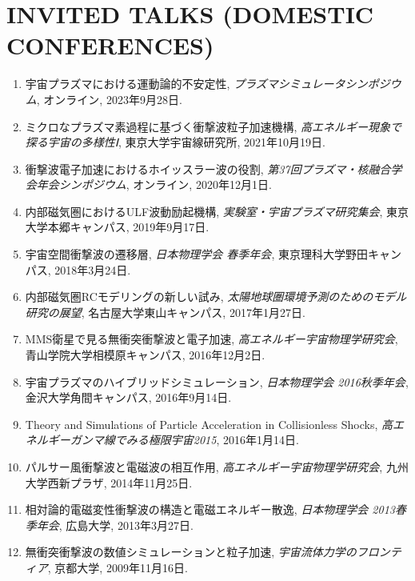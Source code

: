 \documentclass[lualatex,a4paper,ja=standard]{scrartcl}
\newcommand{\NewPart}[2]{\section*{\uppercase{#1} #2}}
\newcommand{\TalkEntry}[3]{
\item #1, \textit{#2}, #3.}
\begin{document}
\newpage
\NewPart{Invited Talks (Domestic Conferences)}{}
\begin{enumerate}

	\TalkEntry
	{宇宙プラズマにおける運動論的不安定性}
	{プラズマシミュレータシンポジウム}
	{オンライン, 2023年9月28日}

	\TalkEntry
	{ミクロなプラズマ素過程に基づく衝撃波粒子加速機構}
	{高エネルギー現象で探る宇宙の多様性Ⅰ}
	{東京大学宇宙線研究所, 2021年10月19日}

	\TalkEntry
	{衝撃波電子加速におけるホイッスラー波の役割}
	{第37回プラズマ・核融合学会年会シンポジウム}
	{オンライン, 2020年12月1日}

	\TalkEntry
	{内部磁気圏におけるULF波動励起機構}
	{実験室・宇宙プラズマ研究集会}
	{東京大学本郷キャンパス, 2019年9月17日}

	\TalkEntry
	{宇宙空間衝撃波の遷移層}
	{日本物理学会 春季年会}
	{東京理科大学野田キャンパス, 2018年3月24日}

	\TalkEntry
	{内部磁気圏RCモデリングの新しい試み}
	{太陽地球圏環境予測のためのモデル研究の展望}
	{名古屋大学東山キャンパス, 2017年1月27日}

	\TalkEntry
	{MMS衛星で見る無衝突衝撃波と電子加速}
	{高エネルギー宇宙物理学研究会}
	{青山学院大学相模原キャンパス, 2016年12月2日}

	\TalkEntry
	{宇宙プラズマのハイブリッドシミュレーション}
	{日本物理学会 2016秋季年会}
	{金沢大学角間キャンパス, 2016年9月14日}

	\TalkEntry
	{Theory and Simulations of Particle Acceleration in Collisionless Shocks}
	{高エネルギーガンマ線でみる極限宇宙2015}
	{2016年1月14日}

	\TalkEntry
	{パルサー風衝撃波と電磁波の相互作用}
	{高エネルギー宇宙物理学研究会}
	{九州大学西新プラザ, 2014年11月25日}

	\TalkEntry
	{相対論的電磁変性衝撃波の構造と電磁エネルギー散逸}
	{日本物理学会 2013春季年会}
	{広島大学, 2013年3月27日}

	\TalkEntry
	{無衝突衝撃波の数値シミュレーションと粒子加速}
	{宇宙流体力学のフロンティア}
	{京都大学, 2009年11月16日}


\end{enumerate}
\end{document}
